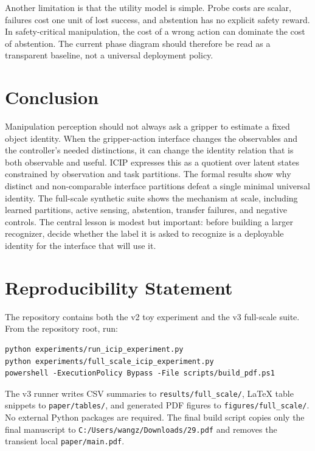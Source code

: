 \documentclass{article}
\newcommand{\icip}{\textsc{ICIP}}
\begin{document}
Another limitation is that the utility model is simple.
Probe costs are scalar, failures cost one unit of lost success, and abstention has no explicit safety reward.
In safety-critical manipulation, the cost of a wrong action can dominate the cost of abstention.
The current phase diagram should therefore be read as a transparent baseline, not a universal deployment policy.

\section{Conclusion}

Manipulation perception should not always ask a gripper to estimate a fixed object identity.
When the gripper-action interface changes the observables and the controller's needed distinctions, it can change the identity relation that is both observable and useful.
\icip{} expresses this as a quotient over latent states constrained by observation and task partitions.
The formal results show why distinct and non-comparable interface partitions defeat a single minimal universal identity.
The full-scale synthetic suite shows the mechanism at scale, including learned partitions, active sensing, abstention, transfer failures, and negative controls.
The central lesson is modest but important: before building a larger recognizer, decide whether the label it is asked to recognize is a deployable identity for the interface that will use it.

\section*{Reproducibility Statement}

The repository contains both the v2 toy experiment and the v3 full-scale suite.
From the repository root, run:
\begin{verbatim}
python experiments/run_icip_experiment.py
python experiments/full_scale_icip_experiment.py
powershell -ExecutionPolicy Bypass -File scripts/build_pdf.ps1
\end{verbatim}
The v3 runner writes CSV summaries to \texttt{results/full\_scale/}, LaTeX table snippets to \texttt{paper/tables/}, and generated PDF figures to \texttt{figures/full\_scale/}.
No external Python packages are required.
The final build script copies only the final manuscript to \texttt{C:/Users/wangz/Downloads/29.pdf} and removes the transient local \texttt{paper/main.pdf}.



\end{document}
